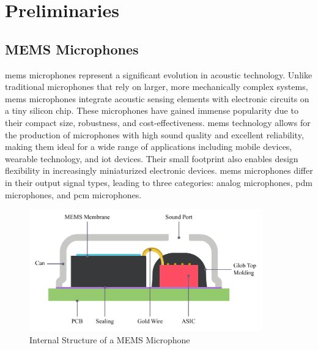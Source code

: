 \chapter{Preliminaries}
\section{MEMS Microphones}
\label{sec:mems_microphones}
\acrfull{mems} microphones represent a significant evolution in acoustic technology.
Unlike traditional microphones that rely on larger, more mechanically complex systems,
\acrshort{mems} microphones integrate acoustic sensing elements with electronic circuits on a tiny silicon chip.
These microphones have gained immense popularity due to their compact size, robustness, and cost-effectiveness.
\acrshort{mems} technology allows for the production of microphones with high sound quality and excellent reliability,
making them ideal for a wide range of applications including mobile devices, wearable technology, and \acrshort{iot} devices.
Their small footprint also enables design flexibility in increasingly miniaturized electronic devices.
\acrshort{mems} microphones differ in their output signal types, leading to three categories: analog microphones, \acrshort{pdm} microphones, and \acrshort{pcm} microphones.
\begin{figure}[h]
	\centering
	\includegraphics[width=0.9\textwidth]{images/2_preliminaries/mems_microphone_illustration.pdf}
	\caption{Internal Structure of a MEMS Microphone \cite{mems_microphone_construction}}
	\label{fig:mems_microphone}
\end{figure}
\vfill

